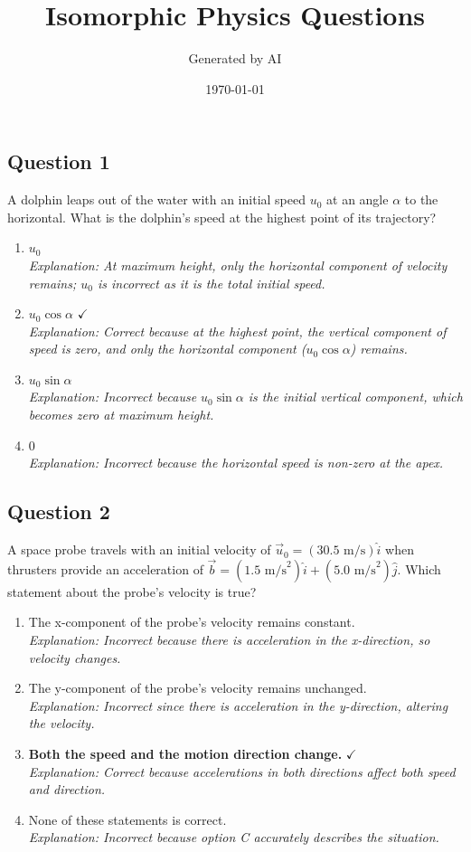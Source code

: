 \documentclass[11pt]{article}
\newcommand{\QBlock}[3]{%
  \subsection*{Question #1}
  #2
  \begin{enumerate}[label=(\Alph*)]
  #3
  \end{enumerate}
  \vspace{1em}
}
\newcommand{\Correct}[2]{%
  \item \textbf{#1} \hfill $\checkmark$ \\
  \textit{Explanation: #2}
}
\newcommand{\Wrong}[2]{%
  \item #1 \\
  \textit{Explanation: #2}
}
\begin{document}
\title{Isomorphic Physics Questions}
\author{Generated by AI}
\date{\today}
\maketitle


\QBlock{1}{A dolphin leaps out of the water with an initial speed $u_0$ at an angle $\alpha$ to the horizontal. What is the dolphin's speed at the highest point of its trajectory?}{
  \Wrong{$u_0$}{At maximum height, only the horizontal component of velocity remains; $u_0$ is incorrect as it is the total initial speed.}
  \Correct{$u_0 \cos \alpha$}{Correct because at the highest point, the vertical component of speed is zero, and only the horizontal component ($u_0 \cos \alpha$) remains.}
  \Wrong{$u_0 \sin \alpha$}{Incorrect because $u_0 \sin \alpha$ is the initial vertical component, which becomes zero at maximum height.}
  \Wrong{0}{Incorrect because the horizontal speed is non-zero at the apex.}
}

\QBlock{2}{A space probe travels with an initial velocity of $\vec{u}_0 = (30.5 \text{ m/s})\hat{i}$ when thrusters provide an acceleration of $\vec{b} = (1.5 \text{ m/s}^2)\hat{i}+(5.0 \text{ m/s}^2)\hat{j}$. Which statement about the probe's velocity is true?}{
  \Wrong{The x-component of the probe’s velocity remains constant.}{Incorrect because there is acceleration in the x-direction, so velocity changes.}
  \Wrong{The y-component of the probe’s velocity remains unchanged.}{Incorrect since there is acceleration in the y-direction, altering the velocity.}
  \Correct{Both the speed and the motion direction change.}{Correct because accelerations in both directions affect both speed and direction.}
  \Wrong{None of these statements is correct.}{Incorrect because option C accurately describes the situation.}
}
\end{document}
